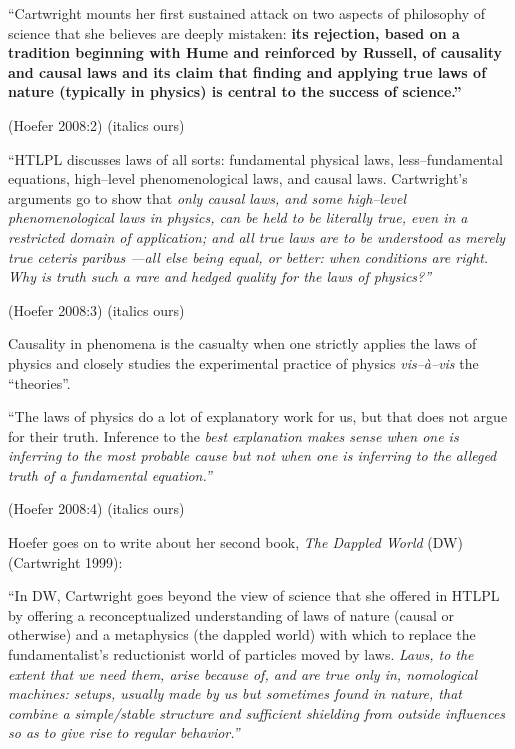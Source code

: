 \begin{myquote}
“Cartwright mounts her first sustained attack on two aspects of philosophy of science that she believes are deeply mistaken: \textbf{its rejection, based on a tradition beginning with Hume and reinforced by Russell, of causality and causal laws and its claim that finding and applying true laws of nature (typically in physics) is central to the success of science.”}
\end{myquote}

\hfill (Hoefer 2008:2) (italics ours)

\begin{myquote}
“HTLPL discusses laws of all sorts: fundamental physical laws, less–fundamental equations, high–level phenomenological laws, and causal laws. Cartwright’s arguments go to show that \textit{only causal laws, and some high–level phenomenological laws in physics, can be held to be literally true, even in a restricted domain of application; and all true laws are to be understood as merely true ceteris paribus —all else being equal, or better: when conditions are right. Why is truth such a rare and hedged quality for the laws of physics?”}
\end{myquote}

\hfill (Hoefer 2008:3) (italics ours)

Causality in phenomena is the casualty when one strictly applies the laws of physics and closely studies the experimental practice of physics \textit{vis–à–vis} the “theories”.

\begin{myquote}
“The laws of physics do a lot of explanatory work for us, but that does not argue for their truth. Inference to the \textit{best explanation makes sense when one is inferring to the most probable cause but not when one is inferring to the alleged truth of a fundamental equation.”}
\end{myquote}

\hfill (Hoefer 2008:4) (italics ours)

Hoefer goes on to write about her second book, \textit{The Dappled World} (DW)(Cartwright 1999):

\begin{myquote}
“In DW, Cartwright goes beyond the view of science that she offered in HTLPL by offering a reconceptualized understanding of laws of nature (causal or otherwise) and a metaphysics (the dappled world) with which to replace the fundamentalist’s reductionist world of particles moved by laws. \textit{Laws, to the extent that we need them, arise because of, and are true only in, nomological machines: setups, usually made by us but sometimes found in nature, that combine a simple/stable structure and sufficient shielding from outside influences so as to give rise to regular behavior.”}
\end{myquote}


